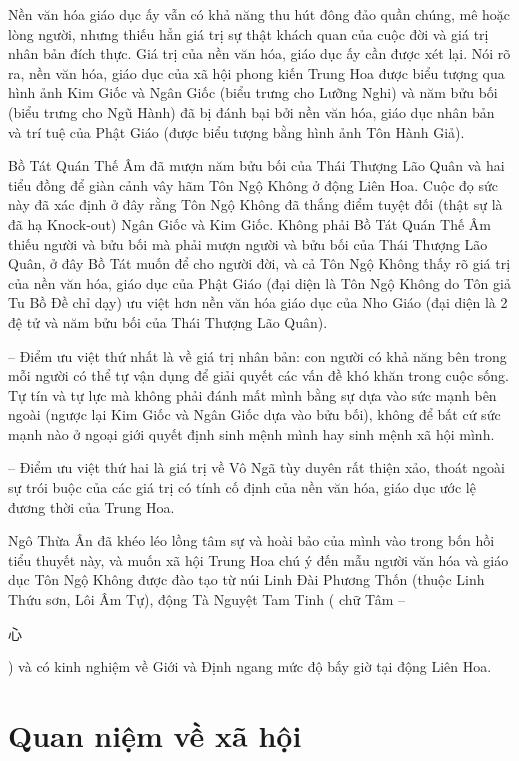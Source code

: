Nền văn hóa giáo dục ấy vẫn có khả năng thu hút đông đảo quần chúng, mê hoặc lòng người, nhưng thiếu hẳn giá trị sự thật khách quan của cuộc đời và giá trị nhân bản đích thực. Giá trị của nền văn hóa, giáo dục ấy cần được xét lại. Nói rõ ra, nền văn hóa, giáo dục của xã hội phong kiến Trung Hoa được biểu tượng qua hình ảnh Kim Giốc và Ngân Giốc (biểu trưng cho Lưỡng Nghi) và năm bửu bối (biểu trưng cho Ngũ Hành) đã bị đánh bại bởi nền văn hóa, giáo dục nhân bản và trí tuệ của Phật Giáo (được biểu tượng bằng hình ảnh Tôn Hành Giả).

Bồ Tát Quán Thế Âm đã mượn năm bửu bối của Thái Thượng Lão Quân và hai tiểu đồng để giàn cảnh vây hãm Tôn Ngộ Không ở động Liên Hoa. Cuộc đọ sức này đã xác định ở đây rằng Tôn Ngộ Không đã thắng điểm tuyệt đối (thật sự là đã hạ Knock-out) Ngân Giốc và Kim Giốc. Không phải Bồ Tát Quán Thế Âm thiếu người và bửu bối mà phải mượn người và bửu bối của Thái Thượng Lão Quân, ở đây Bồ Tát muốn để cho người đời, và cả Tôn Ngộ Không thấy rõ giá trị của nền văn hóa, giáo dục của Phật Giáo (đại diện là Tôn Ngộ Không do Tôn giả Tu Bồ Đề chỉ dạy) ưu việt hơn nền văn hóa giáo dục của Nho Giáo (đại diện là 2 đệ tử và năm bửu bối của Thái Thượng Lão Quân).

-- Điểm ưu việt thứ nhất là về giá trị nhân bản: con người có khả năng bên trong mỗi người có thể tự vận dụng để giải quyết các vấn đề khó khăn trong cuộc sống. Tự tín và tự lực mà không phải đánh mất mình bằng sự dựa vào sức mạnh bên ngoài (ngược lại Kim Giốc và Ngân Giốc dựa vào bửu bối), không để bất cứ sức mạnh nào ở ngoại giới quyết định sinh mệnh mình hay sinh mệnh xã hội mình.

-- Điểm ưu việt thứ hai là giá trị về Vô Ngã tùy duyên rất thiện xảo, thoát ngoài sự trói buộc của các giá trị có tính cố định của nền văn hóa, giáo dục ước lệ đương thời của Trung Hoa.

Ngô Thừa Ân đã khéo léo lồng tâm sự và hoài bảo của mình vào trong bốn hồi tiểu thuyết này, và muốn xã hội Trung Hoa chú ý đến mẫu người văn hóa và giáo dục Tôn Ngộ Không được đào tạo từ núi Linh Đài Phương Thốn (thuộc Linh Thứu sơn, Lôi Âm Tự), động Tà Nguyệt Tam Tinh ( chữ Tâm -- \begin{CJK*}{UTF8}{bkai}心 \end{CJK*}) và có kinh nghiệm về Giới và Định ngang mức độ bấy giờ tại động Liên Hoa.

\section{Quan niệm về xã hội} %
\label{sec:33_34_xa_hoi}

